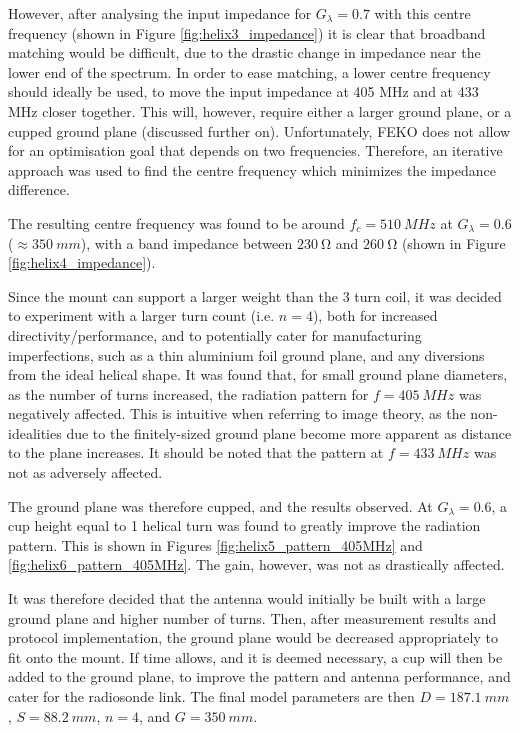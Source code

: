 However, after analysing the input impedance for $G_\lambda = 0.7$ with this centre frequency (shown in Figure \ref{fig:helix3_impedance}) it is clear that broadband matching would be difficult, due to the drastic change in impedance near the lower end of the spectrum. In order to ease matching, a lower centre frequency should ideally be used, to move the input impedance at 405 MHz and at 433 MHz closer together. This will, however, require either a larger ground plane, or a cupped ground plane (discussed further on). Unfortunately, FEKO does not allow for an optimisation goal that depends on two frequencies. Therefore, an iterative approach was used to find the centre frequency which minimizes the impedance difference. 

The resulting centre frequency was found to be around $f_c = \SI{510}{MHz}$ at $G_\lambda = 0.6$ ($\approx \SI{350}{mm}$), with a band impedance between $\SI{230}{\ohm}$ and $\SI{260}{\ohm}$ (shown in Figure \ref{fig:helix4_impedance}).

Since the mount can support a larger weight than the 3 turn coil, it was decided to experiment with a larger turn count (i.e. $n=4$), both for increased directivity/performance, and to potentially cater for manufacturing imperfections, such as a thin aluminium foil ground plane, and any diversions from the ideal helical shape. It was found that, for small ground plane diameters, as the number of turns increased, the radiation pattern for $f = \SI{405}{MHz}$ was negatively affected. This is intuitive when referring to image theory, as the non-idealities due to the finitely-sized ground plane become more apparent as distance to the plane increases. It should be noted that the pattern at $f = \SI{433}{MHz}$ was not as adversely affected.

The ground plane was therefore cupped, and the results observed. At $G_\lambda = 0.6$, a cup height equal to 1 helical turn was found to greatly improve the radiation pattern. This is shown in Figures \ref{fig:helix5_pattern_405MHz} and \ref{fig:helix6_pattern_405MHz}. The gain, however, was not as drastically affected.

It was therefore decided that the antenna would initially be built with a large ground plane and higher number of turns. Then, after measurement results and protocol implementation, the ground plane would be decreased appropriately to fit onto the mount. If time allows, and it is deemed necessary, a cup will then be added to the ground plane, to improve the pattern and antenna performance, and cater for the radiosonde link. The final model parameters are then $D = \SI{187.1}{mm}$, $S = \SI{88.2}{mm}$, $n = 4$, and $G = \SI{350}{mm}$.

